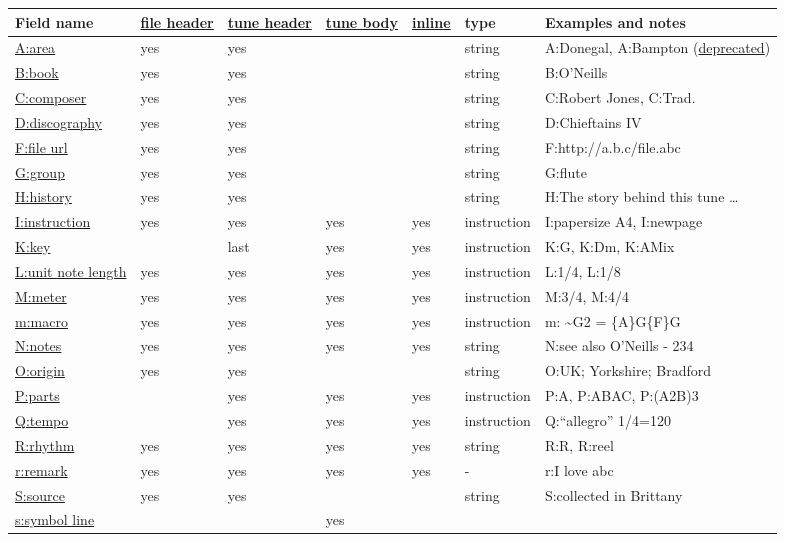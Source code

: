 \documentclass[oneside]{book}
\begin{document}
\begin{longtable}[]{@{}lllllll@{}}
\toprule
Field name & \protect\hyperlink{file_header_definition}{file header} &
\protect\hyperlink{tune_header_definition}{tune header} &
\protect\hyperlink{tune_body_definition}{tune body} &
\protect\hyperlink{inline_field_definition}{inline} & type & Examples
and notes\tabularnewline
\midrule
\endhead
\protect\hyperlink{aarea}{A:area} & yes & yes & & & string & A:Donegal,
A:Bampton
(\protect\hyperlink{outdated_information_field_syntax}{deprecated})\tabularnewline
\protect\hyperlink{bdfsbackground_information}{B:book} & yes & yes & & &
string & B:O'Neills\tabularnewline
\protect\hyperlink{ccomposer}{C:composer} & yes & yes & & & string &
C:Robert Jones, C:Trad.\tabularnewline
\protect\hyperlink{bdfsbackground_information}{D:discography} & yes &
yes & & & string & D:Chieftains IV\tabularnewline
\protect\hyperlink{bdfsbackground_information}{F:file url} & yes & yes &
& & string & F:http://a.b.c/file.abc\tabularnewline
\protect\hyperlink{ggroup}{G:group} & yes & yes & & & string &
G:flute\tabularnewline
\protect\hyperlink{hhistory}{H:history} & yes & yes & & & string & H:The
story behind this tune \ldots{}\tabularnewline
\protect\hyperlink{iinstruction}{I:instruction} & yes & yes & yes & yes
& instruction & I:papersize A4, I:newpage\tabularnewline
\protect\hyperlink{kkey}{K:key} & & last & yes & yes & instruction &
K:G, K:Dm, K:AMix\tabularnewline
\protect\hyperlink{lunit_note_length}{L:unit note length} & yes & yes &
yes & yes & instruction & L:1/4, L:1/8\tabularnewline
\protect\hyperlink{mmeter}{M:meter} & yes & yes & yes & yes &
instruction & M:3/4, M:4/4\tabularnewline
\protect\hyperlink{macros}{m:macro} & yes & yes & yes & yes &
instruction & m: \textasciitilde{}G2 = \{A\}G\{F\}G\tabularnewline
\protect\hyperlink{nnotes}{N:notes} & yes & yes & yes & yes & string &
N:see also O'Neills - 234\tabularnewline
\protect\hyperlink{oorigin}{O:origin} & yes & yes & & & string & O:UK;
Yorkshire; Bradford\tabularnewline
\protect\hyperlink{pparts}{P:parts} & & yes & yes & yes & instruction &
P:A, P:ABAC, P:(A2B)3\tabularnewline
\protect\hyperlink{qtempo}{Q:tempo} & & yes & yes & yes & instruction &
Q:``allegro'' 1/4=120\tabularnewline
\protect\hyperlink{rrhythm}{R:rhythm} & yes & yes & yes & yes & string &
R:R, R:reel\tabularnewline
\protect\hyperlink{comments_and_remarks}{r:remark} & yes & yes & yes &
yes & - & r:I love abc\tabularnewline
\protect\hyperlink{bdfsbackground_information}{S:source} & yes & yes & &
& string & S:collected in Brittany\tabularnewline
\protect\hyperlink{symbol_lines}{s:symbol line} & & & yes & &

\end{longtable}
\end{document}
